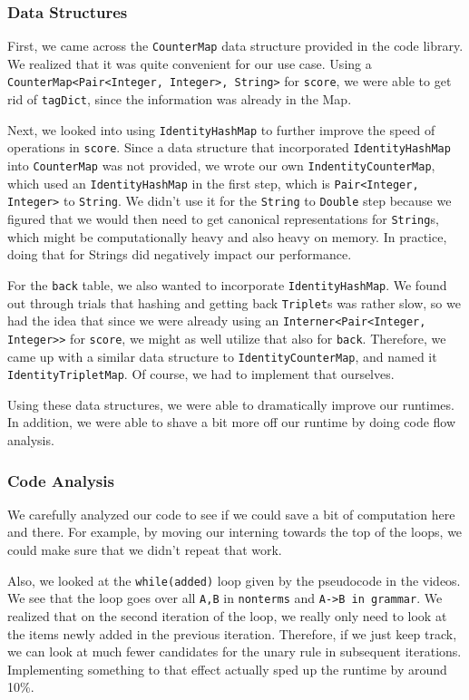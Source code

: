 \documentclass[12pt]{article}
\begin{document}
\subsubsection{Data Structures}
First, we came across the \texttt{CounterMap} data structure provided in the code library. We realized that it was quite convenient for our use case. Using a \texttt{CounterMap<Pair<Integer, Integer>, String>} for \texttt{score}, we were able to get rid of \texttt{tagDict}, since the information was already in the Map.

Next, we looked into using \texttt{IdentityHashMap} to further improve the speed of operations in \texttt{score}. Since a data structure that incorporated \texttt{IdentityHashMap} into \texttt{CounterMap} was not provided, we wrote our own \texttt{IndentityCounterMap}, which used an \texttt{IdentityHashMap} in the first step, which is \texttt{Pair<Integer, Integer>} to \texttt{String}. We didn't use it for the \texttt{String} to \texttt{Double} step because we figured that we would then need to get canonical representations for \texttt{String}s, which might be computationally heavy and also heavy on memory. In practice, doing that for Strings did negatively impact our performance.

For the \texttt{back} table, we also wanted to incorporate \texttt{IdentityHashMap}. We found out through trials that hashing and getting back \texttt{Triplet}s was rather slow, so we had the idea that since we were already using an \texttt{Interner<Pair<Integer, Integer>>} for \texttt{score}, we might as well utilize that also for \texttt{back}. Therefore, we came up with a similar data structure to \texttt{IdentityCounterMap}, and named it \texttt{IdentityTripletMap}. Of course, we had to implement that ourselves.

Using these data structures, we were able to dramatically improve our runtimes. In addition, we were able to shave a bit more off our runtime by doing code flow analysis.
\subsubsection{Code Analysis}
We carefully analyzed our code to see if we could save a bit of computation here and there. For example, by moving our interning towards the top of the loops, we could make sure that we didn't repeat that work.

Also, we looked at the \texttt{while(added)} loop given by the pseudocode in the videos. We see that the loop goes over all \texttt{A,B} in \texttt{nonterms} and \texttt{A->B in grammar}. We realized that on the second iteration of the loop, we really only need to look at the items newly added in the previous iteration. Therefore, if we just keep track, we can look at much fewer candidates for the unary rule in subsequent iterations. Implementing something to that effect actually sped up the runtime by around 10\%.
\end{document}
